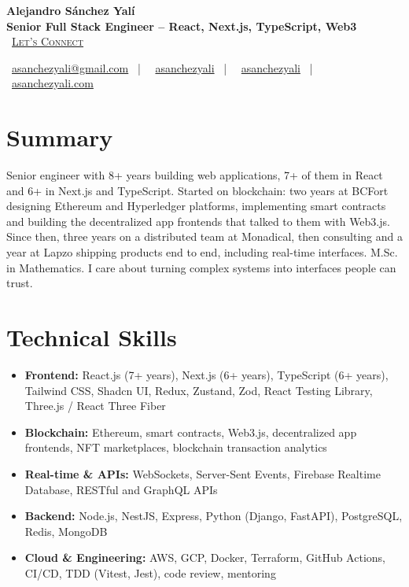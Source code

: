 \documentclass[letterpaper,10pt]{article}
\newcommand{\normalfaCalendar}{{\mdseries\faCalendar}}
\newcommand{\normalfaEnvelope}{{\mdseries\faEnvelope}}
\newcommand{\normalfaLinkedin}{{\mdseries\faLinkedin}}
\newcommand{\normalfaGithub}{{\mdseries\faGithub}}
\newcommand{\normalfaGlobe}{{\mdseries\faGlobe}}
\begin{document}
\begin{center}
\textbf{\LARGE Alejandro S\'anchez Yal\'i}\\[0.2em]
\textbf{\Large Senior Full Stack Engineer -- React, Next.js, TypeScript, Web3}\\[0.4em]
\small
\normalfaCalendar\ \href{https://cal.com/asanchezyali/full-time-opportunities}{\textsc{Let's Connect}}

\vspace{0.5em}
\normalfaEnvelope\ \href{mailto:asanchezyali@gmail.com}{asanchezyali@gmail.com}  ~|~
\normalfaLinkedin\ \href{https://www.linkedin.com/in/asanchezyali}{asanchezyali} ~|~
\normalfaGithub\ \href{https://github.com/asanchezyali}{asanchezyali}  ~|~
\normalfaGlobe\ \href{https://asanchezyali.com}{asanchezyali.com}
\end{center}


\section{Summary}
Senior engineer with 8+ years building web applications, 7+ of them in React and 6+ in Next.js and TypeScript. Started on blockchain: two years at BCFort designing Ethereum and Hyperledger platforms, implementing smart contracts and building the decentralized app frontends that talked to them with Web3.js. Since then, three years on a distributed team at Monadical, then consulting and a year at Lapzo shipping products end to end, including real-time interfaces. M.Sc. in Mathematics. I care about turning complex systems into interfaces people can trust.

\section{Technical Skills}
\begin{itemize}[leftmargin=*, itemsep=0pt]
  \item \textbf{Frontend:} React.js (7+ years), Next.js (6+ years), TypeScript (6+ years), Tailwind CSS, Shadcn UI, Redux, Zustand, Zod, React Testing Library, Three.js / React Three Fiber
  \item \textbf{Blockchain:} Ethereum, smart contracts, Web3.js, decentralized app frontends, NFT marketplaces, blockchain transaction analytics
  \item \textbf{Real-time \& APIs:} WebSockets, Server-Sent Events, Firebase Realtime Database, RESTful and GraphQL APIs
  \item \textbf{Backend:} Node.js, NestJS, Express, Python (Django, FastAPI), PostgreSQL, Redis, MongoDB
  \item \textbf{Cloud \& Engineering:} AWS, GCP, Docker, Terraform, GitHub Actions, CI/CD, TDD (Vitest, Jest), code review, mentoring
\end{itemize}
\end{document}
